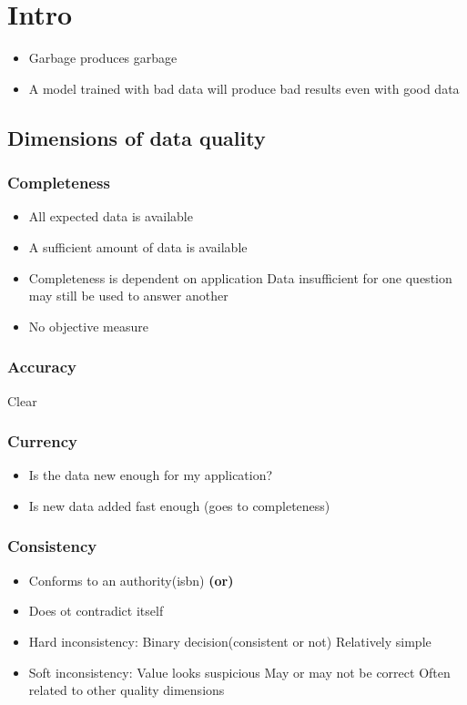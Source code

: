 \documentclass[10pt,a4paper]{scrreprt}
\begin{document}
\section{Intro}
\begin{itemize}
	\item Garbage produces garbage
	\item A model trained with bad data will produce bad results even with good data
\end{itemize}
	
\subsection{Dimensions of data quality}
\subsubsection{Completeness}
\begin{itemize}
	\item All expected data is available
	\item A sufficient amount of data is available
	\item Completeness is dependent on application
	\subitem Data insufficient for one question may still be used to answer another
	\item No objective measure
\end{itemize}

\subsubsection{Accuracy}
Clear

\subsubsection{Currency}
\begin{itemize}
	\item Is the data new enough for my application?
	\item Is new data added fast enough (goes to completeness)
\end{itemize}

\subsubsection{Consistency}
\begin{itemize}
	\item Conforms to an authority(isbn) \textbf{(or)}
	\item Does ot contradict itself
	\item Hard inconsistency:
	\subitem Binary decision(consistent or not)
	\subitem Relatively simple
	\item Soft inconsistency:
	\subitem Value looks suspicious
	\subitem May or may  not be correct
	\subitem Often related to other quality dimensions
\end{itemize}
\end{document}
